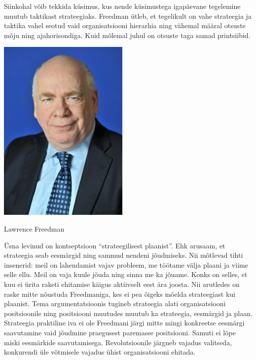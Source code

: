 \documentclass{tufte-book}
\begin{document}
Siinkohal võib tekkida küsimus, kus nende küsimustega igapäevane tegelemine muutub taktikast strateegiaks. Freedman ütleb, et tegelikult on vahe strateegia ja taktika vahel seotud vaid organisatsiooni hierarhia ning vähemal määral otsuste mõju ning ajahorisondiga. Kuid mõlemal juhul on otsuste taga samad printsiibid. 
\begin{marginfigure}
	\begin{center}
		\includegraphics[width=.84\linewidth]{freedman.jpg}
		\caption{Lawrence Freedman}
		\label{fig:freedman}
	\end{center}
\end{marginfigure}

Üsna levinud on kontseptsioon \enquote{strateegilisest plaanist}. Ehk arusaam, et strateegia seab eesmärgid ning sammud nendeni jõudmiseks. Nii mõtlevad tihti insenerid: meil on lahendamist vajav probleem, me töötame välja plaani ja viime selle ellu. Meil on vaja kuule jõuda ning sinna me ka jõuame. Konks on selles, et kuu ei ürita raketi ehitamise käigus aktiivselt eest ära joosta. Nii arutledes on raske mitte nõustuda Freedmaniga, kes ei pea õigeks mõelda strateegiast kui plaanist. Tema argumentatsioonis tugineb strateegia alati organisatsiooni positsioonile ning positsiooni muutudes muutub ka strateegia, eesmärgid ja plaan. Strateegia praktiline iva ei ole Freedmani järgi mitte mingi konkreetse eesmärgi saavutamine vaid jõudmine praegusest paremasse positsiooni. Samuti ei lõpe miski eesmärkide saavutamisega. Revolutsioonile järgneb vajadus valitseda, konkurendi üle võtmisele vajadus ühist organisatsiooni ehitada. 
\end{document}

